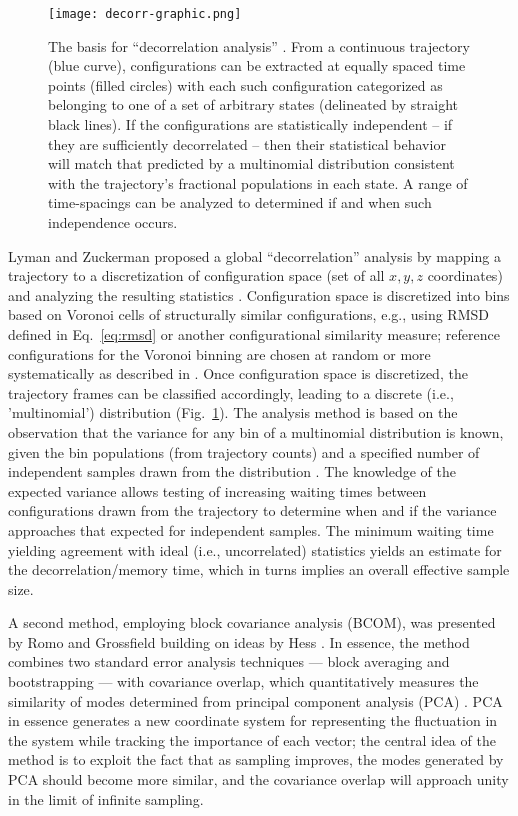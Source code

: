 \begin{figure}
  \centering
  \texttt{[image: decorr-graphic.png]}
  \caption{The basis for ``decorrelation analysis'' \cite{Lyman2007a}.
  From a continuous trajectory (blue curve), configurations can be extracted at equally spaced time points (filled circles) with each such configuration categorized as belonging to one of a set of arbitrary states (delineated by straight black lines).  
  If the configurations are statistically independent -- if they are sufficiently decorrelated -- then their statistical behavior will match that predicted by a multinomial distribution consistent with the trajectory's fractional populations in each state.
  A range of time-spacings can be analyzed to determined if and when such independence occurs.}
  \label{fig:decorr}
\end{figure}

Lyman and Zuckerman proposed a global ``decorrelation'' analysis by mapping a trajectory to a discretization of configuration space (set of all $x, y, z$ coordinates) and analyzing the resulting statistics \cite{Lyman2007a}.
Configuration space is discretized into bins based on Voronoi cells of structurally similar configurations,  e.g., using RMSD defined in Eq.\ \ref{eq:rmsd} or another configurational similarity measure; reference configurations for the Voronoi binning are chosen at random or more systematically as described in \cite{Lyman2007a}.
Once configuration space is discretized, the trajectory frames can be classified accordingly, leading to a discrete (i.e., 'multinomial') distribution (Fig.\ \ref{fig:decorr}).
The analysis method is based on the observation that the variance for any bin of a multinomial distribution is known, given the bin populations (from trajectory counts) and a specified number of independent samples drawn from the distribution \cite{Lyman2007a}.
The knowledge of the expected variance allows testing of increasing waiting times between configurations drawn from the trajectory to determine when and if the variance approaches that expected for independent samples.
The minimum waiting time yielding agreement with ideal (i.e., uncorrelated) statistics yields an estimate for the decorrelation/memory time, which in turns implies an overall effective sample size. 



A second method, employing block covariance analysis (BCOM), was presented by Romo and Grossfield \cite{Romo2011} building on ideas by Hess \cite{Hess2002}.  In essence, the method combines two standard error analysis techniques --- block averaging \cite{Flyvbjerg-1989} and bootstrapping \cite{Tibshirani1998} --- with covariance overlap, which quantitatively measures the similarity of modes determined from principal component analysis (PCA) \cite{Hess2002}.  PCA in essence generates a new coordinate system for representing the fluctuation in the system while tracking the importance of each vector; the central idea of the method is to exploit the fact that as sampling improves, the modes generated by PCA should become more similar, and the covariance overlap will approach unity in the limit of infinite sampling.

